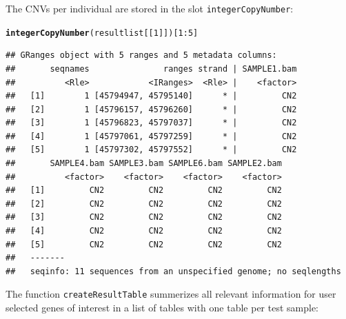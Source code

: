 \documentclass[article]{bioinf}\usepackage[]{graphicx}\usepackage[]{color}
\makeatletter
\newcommand{\hlnum}[1]{\textcolor[rgb]{0.686,0.059,0.569}{#1}}%
\newcommand{\hlopt}[1]{\textcolor[rgb]{0,0,0}{#1}}%
\newcommand{\hlstd}[1]{\textcolor[rgb]{0.345,0.345,0.345}{#1}}%
\newcommand{\hlkwd}[1]{\textcolor[rgb]{0.737,0.353,0.396}{\textbf{#1}}}%
\newenvironment{kframe}{%
 \def\at@end@of@kframe{}%
 \ifinner\ifhmode%
  \def\at@end@of@kframe{\end{minipage}}%
  \begin{minipage}{\columnwidth}%
 \fi\fi%
 \def\FrameCommand##1{\hskip\@totalleftmargin \hskip-\fboxsep
 \colorbox{shadecolor}{##1}\hskip-\fboxsep
     \hskip-\linewidth \hskip-\@totalleftmargin \hskip\columnwidth}%
 \MakeFramed {\advance\hsize-\width
   \@totalleftmargin\z@ \linewidth\hsize
   \@setminipage}}%
 {\par\unskip\endMakeFramed%
 \at@end@of@kframe}
\newenvironment{knitrout}{}{} %
\makeatother
\begin{document}
The CNVs per individual are stored in the slot \verb+integerCopyNumber+:
\begin{knitrout}
\color{fgcolor}\begin{kframe}
\begin{alltt}
\hlkwd{integerCopyNumber}\hlstd{(resultlist[[}\hlnum{1}\hlstd{]])[}\hlnum{1}\hlopt{:}\hlnum{5}\hlstd{]}
\end{alltt}
\begin{verbatim}
## GRanges object with 5 ranges and 5 metadata columns:
##       seqnames               ranges strand | SAMPLE1.bam
##          <Rle>            <IRanges>  <Rle> |    <factor>
##   [1]        1 [45794947, 45795140]      * |         CN2
##   [2]        1 [45796157, 45796260]      * |         CN2
##   [3]        1 [45796823, 45797037]      * |         CN2
##   [4]        1 [45797061, 45797259]      * |         CN2
##   [5]        1 [45797302, 45797552]      * |         CN2
##       SAMPLE4.bam SAMPLE3.bam SAMPLE6.bam SAMPLE2.bam
##          <factor>    <factor>    <factor>    <factor>
##   [1]         CN2         CN2         CN2         CN2
##   [2]         CN2         CN2         CN2         CN2
##   [3]         CN2         CN2         CN2         CN2
##   [4]         CN2         CN2         CN2         CN2
##   [5]         CN2         CN2         CN2         CN2
##   -------
##   seqinfo: 11 sequences from an unspecified genome; no seqlengths
\end{verbatim}
\end{kframe}
\end{knitrout}



The function \verb+createResultTable+ summerizes all relevant information for user selected genes of interest in a list of tables with one table per test sample:
\end{document}

